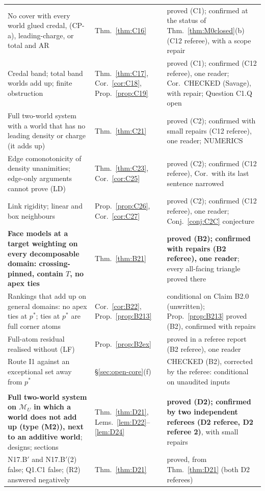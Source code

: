 \documentclass[11pt]{article}
\theoremstyle{definition}
\theoremstyle{remark}
\newcommand{\M}{\mathcal M}
\begin{document}
{\begin{longtable}{>{\raggedright\arraybackslash}p{6.4cm}>{\raggedright\arraybackslash}p{2.1cm}>{\raggedright\arraybackslash}p{5.6cm}}
No cover with every world glued credal, (CP-a), leading-charge, or total and AR & Thm.~\ref{thm:C16} & proved (C1); confirmed at the status of Thm.~\ref{thm:M0closed}(b) (C12 referee), with a scope repair\\
Credal band; total band worlds add up; finite obstruction & Thm.~\ref{thm:C17}, Cor.~\ref{cor:C18}, Prop.~\ref{prop:C19} & proved (C1); confirmed (C12 referee), one reader; Cor.\ CHECKED (Savage), with repair; Question C1.Q open\\
Full two-world system with a world that has no leading density or charge (it adds up) & Thm.~\ref{thm:C21} & proved (C2); confirmed with small repairs (C12 referee), one reader; NUMERICS\\
Edge comonotonicity of density unanimities; edge-only arguments cannot prove (LD) & Thm.~\ref{thm:C23}, Cor.~\ref{cor:C25} & proved (C2); confirmed (C12 referee), Cor.\ with its last sentence narrowed\\
Link rigidity; linear and box neighbours & Prop.~\ref{prop:C26}, Cor.~\ref{cor:C27} & proved (C2); confirmed (C12 referee), one reader; Conj.~\ref{conj:C2C} conjecture\\
\textbf{Face models at a target weighting on every decomposable domain: crossing-pinned, contain $T$, no apex ties} & Thm.~\ref{thm:B21} & \textbf{proved (B2); confirmed with repairs (B2 referee), one reader}; every all-facing triangle proved there\\
Rankings that add up on general domains: no apex ties at $p^*$; ties at $p^*$ are full corner atoms & Cor.~\ref{cor:B22}, Prop.~\ref{prop:B213} & conditional on Claim B2.0 (unwritten); Prop.~\ref{prop:B213} proved (B2), confirmed with repairs\\
Full-atom residual realised without (LF) & Prop.~\ref{prop:B2ex} & proved in a referee report (B2 referee), one reader\\
Route I1 against an exceptional set away from $p^*$ & \S\ref{sec:open-core}(f) & CHECKED (B2), corrected by the referee: conditional on unaudited inputs\\
\multicolumn{3}{l}{\emph{Round 16} (\S\ref{sec:open-core}(e), (f))}\\
\textbf{Full two-world system on $\M_U$ in which a world does not add up (type (M2)), next to an additive world}; designs; sections & Thm.~\ref{thm:D21}, Lems.~\ref{lem:D22}--\ref{lem:D24} & \textbf{proved (D2); confirmed by two independent referees (D2 referee, D2 referee 2)}, with small repairs\\
N17.B$'$ and N17.B$'$(2) false; Q1.C1 false; (R2) answered negatively & Thm.~\ref{thm:D21} & proved, from Thm.~\ref{thm:D21} (both D2 referees)\\

\end{longtable}}
\end{document}
